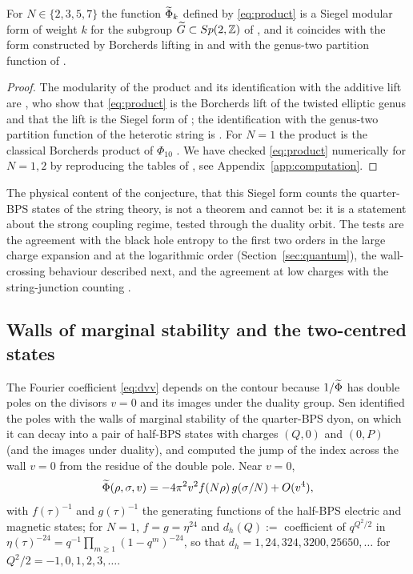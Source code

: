 \begin{theorem}[claim 6]\label{thm:chl}
For $N\in\{2,3,5,7\}$ the function $\widetilde{\Phi}_k$ defined by \eqref{eq:product} is a Siegel modular form of weight $k$ for the subgroup $\widetilde G\subset Sp(2,\mathbb{Z})$ of \cite{JatkarSen06}, and it coincides with the form constructed by Borcherds lifting in \cite{DabholkarNampuri07} and with the genus-two partition function of \cite{DabholkarGaiotto07}.
\end{theorem}

\begin{proof}
The modularity of the product and its identification with the additive lift are \cite[Section~3]{DabholkarNampuri07}, who show that \eqref{eq:product} is the Borcherds lift of the twisted elliptic genus and that the lift is the Siegel form of \cite{JatkarSen06}; the identification with the genus-two partition function of the heterotic string is \cite{DabholkarGaiotto07}. For $N=1$ the product is the classical Borcherds product of $\Phi_{10}$ \cite{GritsenkoNikulin97}. We have checked \eqref{eq:product} numerically for $N=1,2$ by reproducing the tables of \cite{Sen11positivity}, see Appendix~\ref{app:computation}.
\end{proof}

The physical content of the conjecture, that this Siegel form counts the quarter-BPS states of the string theory, is not a theorem and cannot be: it is a statement about the strong coupling regime, tested through the duality orbit. The tests are the agreement with the black hole entropy to the first two orders in the large charge expansion \cite{CDKM04,JatkarSen06,DavidSen06} and at the logarithmic order (Section~\ref{sec:quantum}), the wall-crossing behaviour described next, and the agreement at low charges with the string-junction counting \cite{Sen07junction}.

\subsection{Walls of marginal stability and the two-centred states}\label{ssec:walls}

The Fourier coefficient \eqref{eq:dvv} depends on the contour because $1/\widetilde{\Phi}$ has double poles on the divisors $v=0$ and its images under the duality group. Sen \cite{Sen07walls} identified the poles with the walls of marginal stability of the quarter-BPS dyon, on which it can decay into a pair of half-BPS states with charges $(Q,0)$ and $(0,P)$ (and the images under duality), and computed the jump of the index across the wall $v=0$ from the residue of the double pole. Near $v=0$,
\begin{equation}\label{eq:nearpole}
\widetilde{\Phi}(\rho,\sigma,v) = -4\pi^2 v^2 f(N\rho)\,g(\sigma/N) + O(v^4),
\end{equation}
with $f(\tau)^{-1}$ and $g(\tau)^{-1}$ the generating functions of the half-BPS electric and magnetic states; for $N=1$, $f=g=\eta^{24}$ and $d_h(Q) := $ coefficient of $q^{Q^2/2}$ in $\eta(\tau)^{-24}=q^{-1}\prod_{m\ge1}(1-q^m)^{-24}$, so that $d_h = 1, 24, 324, 3200, 25650, \dots$ for $Q^2/2 = -1,0,1,2,3,\dots$.

